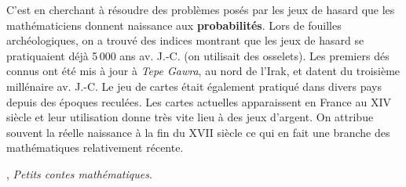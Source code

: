

\vfill
\begin{debat}
   \hspace*{-10mm}
   \begin{minipage}{0.8\linewidth} 
      C’est en cherchant à résoudre des problèmes posés par les jeux de hasard que les mathématiciens donnent naissance aux {\bf probabilités}. Lors de fouilles archéologiques, on a trouvé des indices montrant que les jeux de hasard se pratiquaient déjà 5\,000 ans av. J.-C. (on utilisait des osselets). Les premiers dés connus ont été mis à jour à {\it Tepe Gawra}, au nord de l’Irak, et datent du troisième millénaire av. J.-C. Le jeu de cartes était également pratiqué dans divers pays depuis des époques reculées. Les cartes actuelles apparaissent en France au {\small XIV} siècle et leur utilisation donne très vite lieu à des jeux d’argent. On attribue souvent la réelle naissance à la fin du {\small XVII} siècle ce qui en fait une branche des mathématiques relativement récente.
   \end{minipage}
   \begin{minipage}{0.3\linewidth}
   \end{minipage}
   \vfill   
   \begin{cadre}[B2][J4]
      \begin{center}
         , {\it Petits contes mathématiques}.
      \end{center}
   \end{cadre}
\end{debat}
